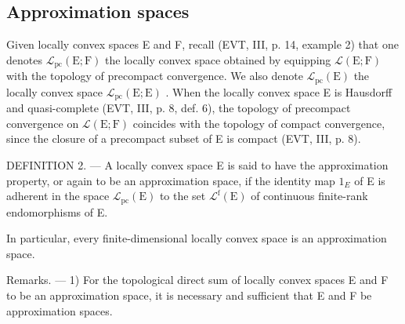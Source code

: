 \subsection{Approximation spaces}

Given locally convex spaces E and F, recall (EVT, III, p. 14, example 2) that one denotes \(\mathcal{L}_{\mathrm{pc}}(\mathrm{E};\mathrm{F})\) the locally convex space obtained by equipping \(\mathcal{L}(\mathrm{E};\mathrm{F})\) with the topology of precompact convergence. We also denote \(\mathcal{L}_{\mathrm{pc}}(\mathrm{E})\) the locally convex space \(\mathcal{L}_{\mathrm{pc}}(\mathrm{E};\mathrm{E})\) . When the locally convex space E is Hausdorff and quasi-complete (EVT, III, p. 8, def. 6), the topology of precompact convergence on \(\mathcal{L}(\mathrm{E};\mathrm{F})\) coincides with the topology of compact convergence, since the closure of a precompact subset of E is compact (EVT, III, p. 8).

DEFINITION 2. --- A locally convex space E is said to have the approximation property, or again to be an approximation space, if the identity map \(1_{E}\) of E is adherent in the space \(\mathcal{L}_{\mathrm{pc}}(\mathrm{E})\) to the set \(\mathcal{L}^{\mathrm{f}}(\mathrm{E})\) of continuous finite-rank endomorphisms of E.

In particular, every finite-dimensional locally convex space is an approximation space.

Remarks. --- 1) For the topological direct sum of locally convex spaces E and F to be an approximation space, it is necessary and sufficient that E and F be approximation spaces.

